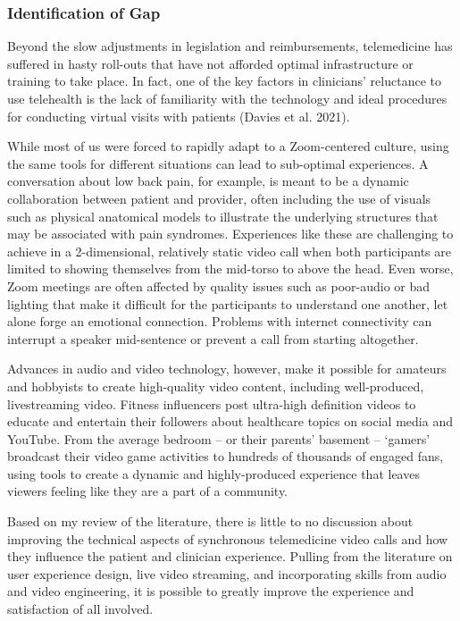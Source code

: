 \documentclass[
  letterpaper,
]{article}
\begin{document}
\subsubsection{Identification of Gap}\label{identification-of-gap}

Beyond the slow adjustments in legislation and reimbursements,
telemedicine has suffered in hasty roll-outs that have not afforded
optimal infrastructure or training to take place. In fact, one of the
key factors in clinicians' reluctance to use telehealth is the lack of
familiarity with the technology and ideal procedures for conducting
virtual visits with patients (Davies et al. 2021).

While most of us were forced to rapidly adapt to a Zoom-centered
culture, using the same tools for different situations can lead to
sub-optimal experiences. A conversation about low back pain, for
example, is meant to be a dynamic collaboration between patient and
provider, often including the use of visuals such as physical anatomical
models to illustrate the underlying structures that may be associated
with pain syndromes. Experiences like these are challenging to achieve
in a 2-dimensional, relatively static video call when both participants
are limited to showing themselves from the mid-torso to above the head.
Even worse, Zoom meetings are often affected by quality issues such as
poor-audio or bad lighting that make it difficult for the participants
to understand one another, let alone forge an emotional connection.
Problems with internet connectivity can interrupt a speaker mid-sentence
or prevent a call from starting altogether.

Advances in audio and video technology, however, make it possible for
amateurs and hobbyists to create high-quality video content, including
well-produced, livestreaming video. Fitness influencers post ultra-high
definition videos to educate and entertain their followers about
healthcare topics on social media and YouTube. From the average bedroom
-- or their parents' basement -- `gamers' broadcast their video game
activities to hundreds of thousands of engaged fans, using tools to
create a dynamic and highly-produced experience that leaves viewers
feeling like they are a part of a community.

Based on my review of the literature, there is little to no discussion
about improving the technical aspects of synchronous telemedicine video
calls and how they influence the patient and clinician experience.
Pulling from the literature on user experience design, live video
streaming, and incorporating skills from audio and video engineering, it
is possible to greatly improve the experience and satisfaction of all
involved.
\end{document}
